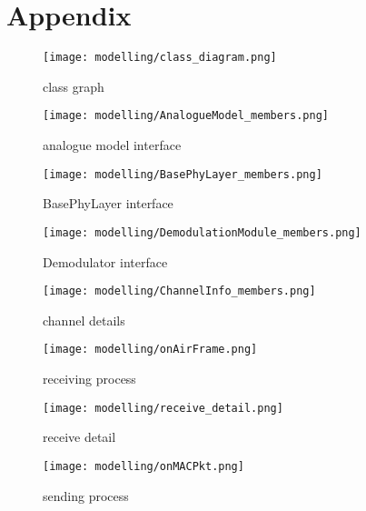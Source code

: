 \section{Appendix}

\begin{figure}[h]
 \centering
 \texttt{[image: modelling/class\_diagram.png]}
 \caption{class graph}
 \label{fig: class graph}
\end{figure}

\begin{figure}[h]
 \centering
 \texttt{[image: modelling/AnalogueModel\_members.png]}
 \caption{analogue model interface}
 \label{fig: analogue model interface}
\end{figure}

\begin{figure}[h]
 \centering
 \texttt{[image: modelling/BasePhyLayer\_members.png]}
 \caption{BasePhyLayer interface}
 \label{fig: BasePhyLayer interface}
\end{figure}

\begin{figure}[h]
 \centering
 \texttt{[image: modelling/DemodulationModule\_members.png]}
 \caption{Demodulator interface}
 \label{fig: Demodulator interface}
\end{figure}

\begin{figure}[h]
 \centering
 \texttt{[image: modelling/ChannelInfo\_members.png]}
 \caption{channel details}
 \label{fig: channel details}
\end{figure}

\begin{figure}[h]
 \centering
 \texttt{[image: modelling/onAirFrame.png]}
 \caption{receiving process}
 \label{fig: receiving process}
\end{figure}

\begin{figure}[h]
 \centering
 \texttt{[image: modelling/receive\_detail.png]}
 \caption{receive detail}
 \label{fig: receive detail}
\end{figure}

\begin{figure}[h]
 \centering
 \texttt{[image: modelling/onMACPkt.png]}
 \caption{sending process}
 \label{fig: sending process}
\end{figure}
